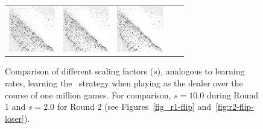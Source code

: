 \begin{figure}[h]
\begin{tabular}{c | c c c c}
			\parbox[c]{5em}{\includegraphics[width=2cm]{images/findings/experiments/learning_rate/lr_150_500.png}} & %
			\parbox[c]{5em}{\includegraphics[width=2cm]{images/findings/experiments/learning_rate/lr_150_750.png}} & %
			\parbox[c]{5em}{\includegraphics[width=2cm]{images/findings/experiments/learning_rate/lr_150_1mm.png}} \\ %
	\end{tabular}

\caption{
	Comparison of different scaling factors ($s$),
	analogous to learning rates,
	learning the \handmaxavg\ strategy
	when playing as the dealer
	over the course of one million games.
	For comparison, $s = 10.0$ during Round 1 and $s = 2.0$ for Round 2
	(see Figures~\ref{fig_r1-flip} and~\ref{fig:r2-flip-loser}).
	}
\label{fig:expts-lr-comp}
\end{figure}
